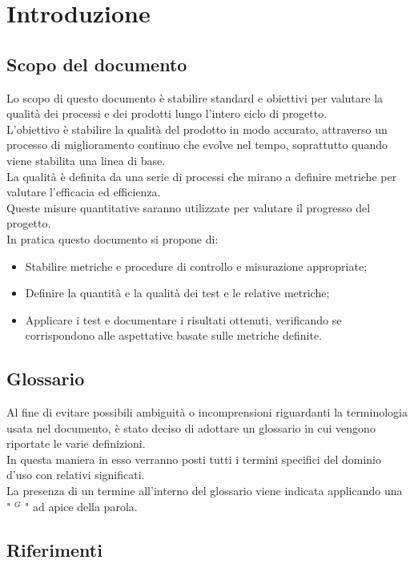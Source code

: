 \nonstopmode

\section{Introduzione}
\subsection{Scopo del documento}
Lo scopo di questo documento è stabilire standard e obiettivi per valutare la qualità
dei processi e dei prodotti lungo l'intero ciclo di progetto. \\
L'obiettivo è stabilire la qualità del prodotto in modo accurato, attraverso un processo di miglioramento continuo che evolve nel tempo, soprattutto quando viene stabilita
una linea di base. \\
La qualità è definita da una serie di processi che mirano a definire metriche per valutare
l'efficacia ed efficienza. \\
Queste misure quantitative saranno utilizzate per valutare il progresso del progetto.\\
In pratica questo documento si propone di:

\begin{itemize}
\item Stabilire metriche e procedure di controllo e misurazione appropriate;
\item Definire la quantità e la qualità dei test e le relative metriche;
\item Applicare i test e documentare i risultati ottenuti, verificando se corrispondono alle aspettative basate sulle metriche definite.
\end{itemize}

\subsection{Glossario}
Al fine di evitare possibili ambiguità o incomprensioni riguardanti la terminologia usata nel documento, è stato deciso di adottare un glossario in cui vengono riportate le varie definizioni. \\
In questa maniera in esso verranno posti tutti i termini specifici del dominio d’uso con relativi significati. \\
La presenza di un termine all’interno del glossario viene indicata applicando una " $^{G}$ " ad apice della parola.
\subsection{Riferimenti}
